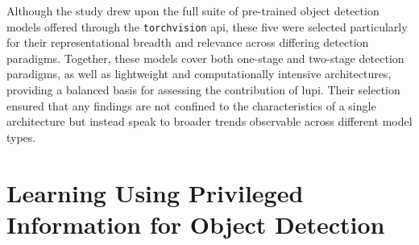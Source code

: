 Although the study drew upon the full suite of pre-trained object detection models offered through the \verb|torchvision| \gls{api}, these five were selected particularly for their representational breadth and relevance across differing detection paradigms. Together, these models cover both one-stage and two-stage detection paradigms, as well as lightweight and computationally intensive architectures, providing a balanced basis for assessing the contribution of \gls{lupi}. Their selection ensured that any findings are not confined to the characteristics of a single architecture but instead speak to broader trends observable across different model types.




\section{Learning Using Privileged Information for Object Detection}
\label{sec:4_lupi4od}



